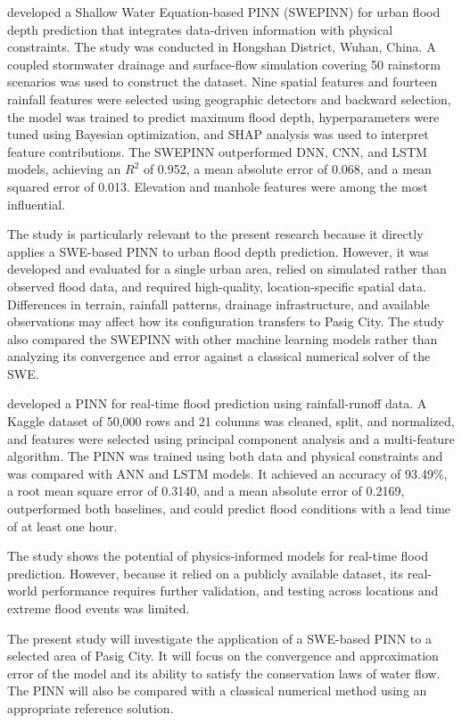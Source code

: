  developed a Shallow Water Equation-based PINN (SWEPINN) for urban flood depth prediction that integrates data-driven information with physical constraints. The study was conducted in Hongshan District, Wuhan, China. A coupled stormwater drainage and surface-flow simulation covering 50 rainstorm scenarios was used to construct the dataset. Nine spatial features and fourteen rainfall features were selected using geographic detectors and backward selection, the model was trained to predict maximum flood depth, hyperparameters were tuned using Bayesian optimization, and SHAP analysis was used to interpret feature contributions. The SWEPINN outperformed DNN, CNN, and LSTM models, achieving an $R^2$ of 0.952, a mean absolute error of 0.068, and a mean squared error of 0.013. Elevation and manhole features were among the most influential.

The study is particularly relevant to the present research because it directly applies a SWE-based PINN to urban flood depth prediction. However, it was developed and evaluated for a single urban area, relied on simulated rather than observed flood data, and required high-quality, location-specific spatial data. Differences in terrain, rainfall patterns, drainage infrastructure, and available observations may affect how its configuration transfers to Pasig City. The study also compared the SWEPINN with other machine learning models rather than analyzing its convergence and error against a classical numerical solver of the SWE.

 developed a PINN for real-time flood prediction using rainfall-runoff data. A Kaggle dataset of 50,000 rows and 21 columns was cleaned, split, and normalized, and features were selected using principal component analysis and a multi-feature algorithm. The PINN was trained using both data and physical constraints and was compared with ANN and LSTM models. It achieved an accuracy of 93.49\%, a root mean square error of 0.3140, and a mean absolute error of 0.2169, outperformed both baselines, and could predict flood conditions with a lead time of at least one hour.

The study shows the potential of physics-informed models for real-time flood prediction. However, because it relied on a publicly available dataset, its real-world performance requires further validation, and testing across locations and extreme flood events was limited.

The present study will investigate the application of a SWE-based PINN to a selected area of Pasig City. It will focus on the convergence and approximation error of the model and its ability to satisfy the conservation laws of water flow. The PINN will also be compared with a classical numerical method using an appropriate reference solution.

